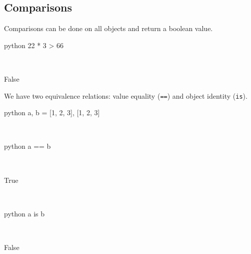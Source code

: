 \documentclass[aspectratio=1610,slidestop]{beamer}
\begin{document}
\subsection{Comparisons}
\begin{pframe}
  Comparisons can be done on all objects and return a boolean value.
 \begin{ipython}
  \begin{pythonin}{python}
22 * 3 > 66
  \end{pythonin}
  \\
  \begin{pythonout}
False
  \end{pythonout}
 \end{ipython}

 We have two equivalence relations: value equality (\texttt{==}) and
 object identity (\texttt{is}).
 \begin{ipython}
  \begin{pythonin}{python}
a, b = [1, 2, 3], [1, 2, 3]
  \end{pythonin}
  \\
  \begin{pythonin}{python}
a == b
  \end{pythonin}
  \\
  \begin{pythonout}
True
  \end{pythonout}
  \\

  \begin{pythonin}{python}
a is b
  \end{pythonin}
  \\
  \begin{pythonout}
False
  \end{pythonout}
 \end{ipython}
\end{pframe}
\end{document}
